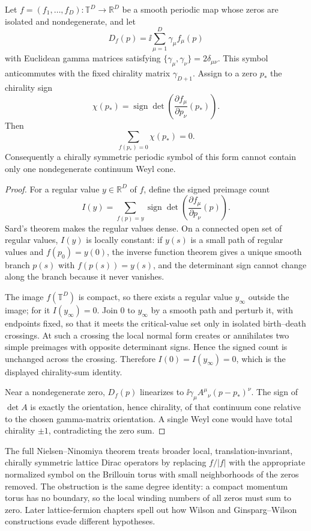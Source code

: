 \begin{theorem}
\label{thm:lattice-degree-obstruction-chiral-symbol}
Let \(f=(f_1,\ldots,f_D):\mathbb T^D\to\mathbb R^D\) be a smooth periodic map
whose zeros are isolated and nondegenerate, and let
\[
  D_f(p)=\ii\sum_{\mu=1}^D\gamma_\mu f_\mu(p)
\]
with Euclidean gamma matrices satisfying
\(\{\gamma_\mu,\gamma_\nu\}=2\delta_{\mu\nu}\).  This symbol anticommutes with
the fixed chirality matrix \(\gamma_{D+1}\).  Assign to a zero \(p_*\) the
chirality sign
\[
  \chi(p_*)=
  \operatorname{sign}\det
  \left(\frac{\partial f_\mu}{\partial p_\nu}(p_*)\right).
\]
Then
\[
  \sum_{f(p_*)=0}\chi(p_*)=0 .
\]
Consequently a chirally symmetric periodic symbol of this form cannot contain
only one nondegenerate continuum Weyl cone.
\end{theorem}

\begin{proof}
For a regular value \(y\in\mathbb R^D\) of \(f\), define the signed preimage
count
\[
  I(y)
  =
  \sum_{f(p)=y}
  \operatorname{sign}\det
  \left(\frac{\partial f_\mu}{\partial p_\nu}(p)\right).
\]
Sard's theorem makes the regular values dense.  On a connected open set of
regular values, \(I(y)\) is locally constant: if \(y(s)\) is a small path of
regular values and \(f(p_0)=y(0)\), the inverse function theorem gives a
unique smooth branch \(p(s)\) with \(f(p(s))=y(s)\), and the determinant sign
cannot change along the branch because it never vanishes.

The image \(f(\mathbb T^D)\) is compact, so there exists a regular value
\(y_\infty\) outside the image; for it \(I(y_\infty)=0\).  Join \(0\) to
\(y_\infty\) by a smooth path and perturb it, with endpoints fixed, so that it
meets the critical-value set only in isolated birth--death crossings.  At such
a crossing the local normal form creates or annihilates two simple preimages
with opposite determinant signs.  Hence the signed count is unchanged across
the crossing.  Therefore \(I(0)=I(y_\infty)=0\), which is the displayed
chirality-sum identity.

Near a nondegenerate zero, \(D_f(p)\) linearizes to
\(\ii\gamma_\mu A^\mu{}_\nu(p-p_*)^\nu\).  The sign of \(\det A\) is exactly
the orientation, hence chirality, of that continuum cone relative to the
chosen gamma-matrix orientation.  A single Weyl cone would have total chirality
\(\pm1\), contradicting the zero sum.
\end{proof}

The full Nielsen--Ninomiya theorem treats broader local,
translation-invariant, chirally symmetric lattice Dirac operators by replacing
\(f/|f|\) with the appropriate normalized symbol on the Brillouin torus with
small neighborhoods of the zeros removed.  The obstruction is the same degree
identity: a compact momentum torus has no boundary, so the local winding
numbers of all zeros must sum to zero.  Later lattice-fermion chapters spell
out how Wilson and Ginsparg--Wilson constructions evade different hypotheses.

